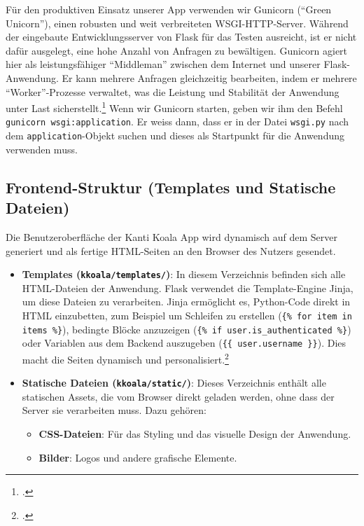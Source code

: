 \documentclass[12pt,a4paper]{report}
\begin{document}
\begin{enumerate}
    Für den produktiven Einsatz unserer App verwenden wir Gunicorn (\enquote{Green Unicorn}), einen robusten und weit verbreiteten WSGI-HTTP-Server. Während der eingebaute Entwicklungsserver von Flask für das Testen ausreicht, ist er nicht dafür ausgelegt, eine hohe Anzahl von Anfragen zu bewältigen. Gunicorn agiert hier als leistungsfähiger \enquote{Middleman} zwischen dem Internet und unserer Flask-Anwendung. Er kann mehrere Anfragen gleichzeitig bearbeiten, indem er mehrere \enquote{Worker}-Prozesse verwaltet, was die Leistung und Stabilität der Anwendung unter Last sicherstellt.\footcite{codesignal_gunicorn} Wenn wir Gunicorn starten, geben wir ihm den Befehl \texttt{gunicorn wsgi:application}. Er weiss dann, dass er in der Datei \texttt{wsgi.py} nach dem \texttt{application}-Objekt suchen und dieses als Startpunkt für die Anwendung verwenden muss.
\end{enumerate}

\subsection{Frontend-Struktur (Templates und Statische Dateien)}
Die Benutzeroberfläche der Kanti Koala App wird dynamisch auf dem Server generiert und als fertige HTML-Seiten an den Browser des Nutzers gesendet.

\begin{itemize}
    \item \textbf{Templates (\texttt{kkoala/templates/})}:
    In diesem Verzeichnis befinden sich alle HTML-Dateien der Anwendung. Flask verwendet die Template-Engine Jinja, um diese Dateien zu verarbeiten. Jinja ermöglicht es, Python-Code direkt in HTML einzubetten, zum Beispiel um Schleifen zu erstellen (\texttt{\{\% for item in items \%\}}), bedingte Blöcke anzuzeigen (\texttt{\{\% if user.is\_authenticated \%\}}) oder Variablen aus dem Backend auszugeben (\texttt{\{\{ user.username \}\}}). Dies macht die Seiten dynamisch und personalisiert.\footcite{jinja_templates, flask_templating}

    \item \textbf{Statische Dateien (\texttt{kkoala/static/})}:
    Dieses Verzeichnis enthält alle statischen Assets, die vom Browser direkt geladen werden, ohne dass der Server sie verarbeiten muss. Dazu gehören:
    \begin{itemize}
        \item \textbf{CSS-Dateien}: Für das Styling und das visuelle Design der Anwendung.
        \item \textbf{Bilder}: Logos und andere grafische Elemente.
    \end{itemize}
\end{itemize}
\end{document}
